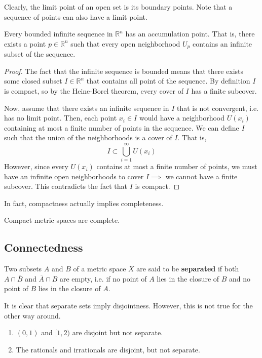 \documentclass{article}
\begin{document}
    Clearly, the limit point of an open set is its boundary points. Note that a sequence of points can also have a limit point. 

    \begin{theorem}
      Every bounded infinite sequence in $\mathbb{R}^n$ has an accumulation point. That is, there exists a point $p \in \mathbb{R}^n$ such that every open neighborhood $U_p$ contains an infinite subset of the sequence. 
    \end{theorem}
    \begin{proof}
      The fact that the infinite sequence is bounded means that there exists some closed subset $I \in \mathbb{R}^n$ that contains all point of the sequence. By definition $I$ is compact, so by the Heine-Borel theorem, every cover of $I$ has a finite subcover. 

      Now, assume that there exists an infinite sequence in $I$ that is not convergent, i.e. has no limit point. Then, each point $x_i \in I$ would have a neighborhood $U(x_i)$ containing at most a finite number of points in the sequence. We can define $I$ such that the union of the neighborhoods is a cover of $I$. That is, 
      \[I \subset \bigcup_{i=1}^\infty U(x_i)\]
      However, since every $U(x_i)$ contains at most a finite number of points, we must have an infinite open neighborhoods to cover $I \implies$ we cannot have a finite subcover. This contradicts the fact that $I$ is compact. 
    \end{proof}

    In fact, compactness actually implies completeness. 

    \begin{theorem}
      Compact metric spaces are complete. 
    \end{theorem}

  \subsection{Connectedness}

    \begin{definition}
      Two subsets $A$ and $B$ of a metric space $X$ are said to be \textbf{separated} if both $A \cap \overline{B}$ and $\overline{A} \cap B$ are empty, i.e. if no point of $A$ lies in the closure of $B$ and no point of $B$ lies in the closure of $A$. 
    \end{definition}

    \begin{example}
      It is clear that separate sets imply disjointness. However, this is not true for the other way around. 
      \begin{enumerate}
        \item $(0, 1)$ and $[1, 2)$ are disjoint but not separate. 
        \item The rationals and irrationals are disjoint, but not separate. 
      \end{enumerate}
    \end{example}
\end{document}
